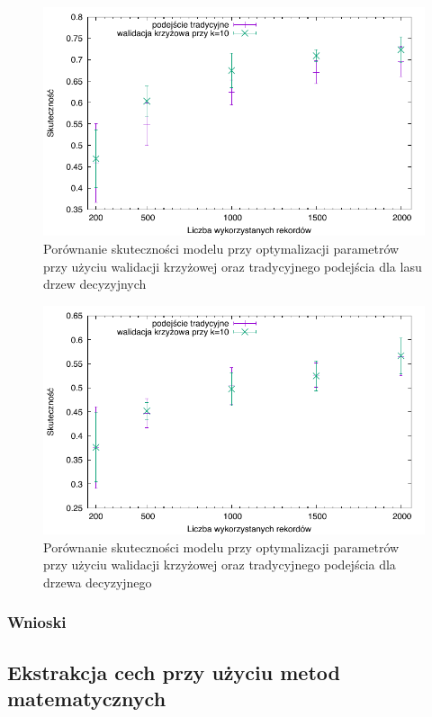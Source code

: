 \begin{figure}
\centering
\includegraphics[scale=\cvsize]{res/cv_forest.pdf}
\caption[Caption for LOF]{Porównanie skuteczności modelu przy optymalizacji parametrów przy użyciu walidacji krzyżowej oraz tradycyjnego podejścia dla lasu drzew decyzyjnych\label{cv_forest}}
\end{figure}

\begin{figure}
\centering
\includegraphics[scale=\cvsize]{res/cv_tree.pdf}
\caption[Caption for LOF]{Porównanie skuteczności modelu przy optymalizacji parametrów przy użyciu walidacji krzyżowej oraz tradycyjnego podejścia dla drzewa decyzyjnego\label{cv_tree}}
\end{figure}
  


\subsubsection{Wnioski}

\subsection{Ekstrakcja cech przy użyciu metod matematycznych}

